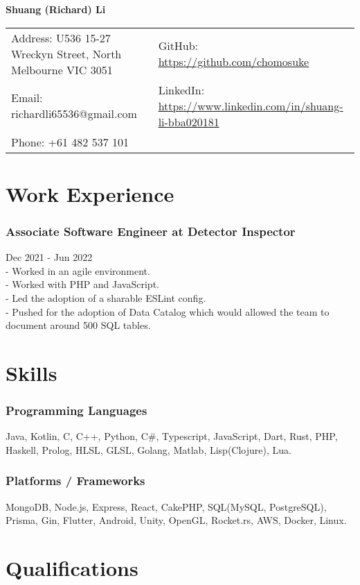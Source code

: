\documentclass[9pt]{extarticle}
\begin{document}
\begin{center}
	\textbf{\LARGE Shuang (Richard) Li}
\end{center}

{\small
\begin{tabular}{l l}
	Address: U536 15-27 Wreckyn Street, North Melbourne VIC 3051 & GitHub: \url{https://github.com/chomosuke} \\
	Email: richardli65536@gmail.com & LinkedIn: \url{https://www.linkedin.com/in/shuang-li-bba020181} \\
	Phone: +61 482 537 101
\end{tabular}
}

\section*{Work Experience}
\subsubsection*{Associate Software Engineer at Detector Inspector}
Dec 2021 - Jun 2022\\
- Worked in an agile environment.\\
- Worked with PHP and JavaScript.\\
- Led the adoption of a sharable ESLint config.\\
- Pushed for the adoption of Data Catalog which would allowed the team to document around 500 SQL tables.

\section*{Skills}
\subsubsection*{Programming Languages}
Java, Kotlin, C, C++, Python, C\#, Typescript, JavaScript, Dart, Rust, PHP, Haskell, Prolog, HLSL, GLSL, Golang, Matlab, Lisp(Clojure), Lua.
\subsubsection*{Platforms / Frameworks}
MongoDB, Node.js, Express, React, CakePHP, SQL(MySQL, PostgreSQL), Prisma, Gin, Flutter, Android, Unity, OpenGL, Rocket.rs, AWS, Docker, Linux.

\section*{Qualifications}
\end{document}
